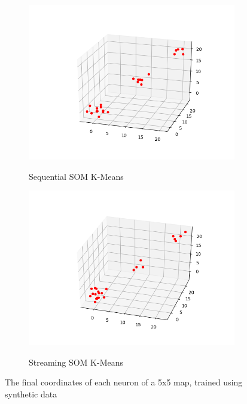 \documentclass{l4proj}
\begin{document}
\begin{figure}[H]
\label{som-synth}
\begin{subfigure}{.5\textwidth}
  \includegraphics[width=0.95\linewidth]{images/result14}
  \label{fig:res14}
  \caption{Sequential SOM K-Means}
\end{subfigure}%
\begin{subfigure}{.5\textwidth}
  \includegraphics[width=0.95\linewidth]{images/result15}
  \label{fig:res15}
  \caption{Streaming SOM K-Means}
\end{subfigure}
\caption{The final coordinates of each neuron of a 5x5 map, trained using synthetic data}
\end{figure}
\end{document}
